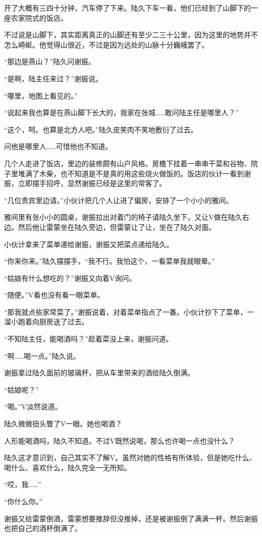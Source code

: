 开了大概有三四十分钟，汽车停了下来。陆久下车一看，他们已经到了山脚下的一座农家院式的饭店。

不过说是山脚下，其实距离真正的山脚还有至少二三十公里，因为这里的地势并不怎么崎岖。他觉得山很近，不过是因为远处的山脉十分巍峨罢了。

“那边是燕山？”陆久问谢振。

“是啊，陆主任来过？”谢振说。

“哪里，地图上看见的。”

“说起来我也算是在燕山脚下长大的，我家在张城……敢问陆主任是哪里人？”

“这个，呵。也算是北方人吧。”陆久皮笑肉不笑地敷衍了过去。

问他是哪里人……可惜他也不知道。

几个人走进了饭店，里边的装修颇有山户风格。房檐下挂着一串串干菜和谷物、院子里堆满了木柴，也不知道是不是真的用这些烧火做饭的。饭店的伙计一看到谢振，立即摆手招呼，显然谢振已经是这里的常客了。

“几位贵宾里边请。”小伙计把几个人让进了偏房，安排了一个小小的雅间。

雅间里有张小小的圆桌，谢振拉出对着门的椅子请陆久坐下，又让V做在陆久右边。然后他让雷蒙坐在陆久旁边，但雷蒙让了让，坐在了陆久对面。

小伙计拿来了菜单递给谢振，谢振又把菜点递给陆久。

“你来你来。”陆久摆摆手，“我不行。我怕这个，一看菜单我就眼晕。”

“姑娘有什么想吃的？”谢振又向着V询问。

“随便。”V看也没有看一眼菜单。

“那我就点些家常菜了。”谢振说着，对着菜单指点了一番。小伙计抄下了菜单，一溜小跑着向厨房送了过去。

“不知陆主任，能喝酒吗？”趁着菜没上来，谢振问道。

“啊……喝一点。”陆久说。

谢振拿过陆久面前的玻璃杯，把从车里带来的酒给陆久倒满。

“姑娘呢？”

“喝。”V淡然说道。

陆久微微扭头瞥了V一眼。她也喝酒？

人形能喝酒吗，陆久不知道。不过V既然说喝，那么也许喝一点也没什么？

陆久这才意识到，自己其实不了解V。虽然对她的性格有所体验，但是她吃什么、喝什么、喜欢什么，陆久完全一无所知。

“哎，我……”

“你什么你。”

谢振又给雷蒙倒酒，雷蒙想要推辞但没推掉，还是被谢振倒了满满一杯。然后谢振也把自己的酒杯倒满了。

